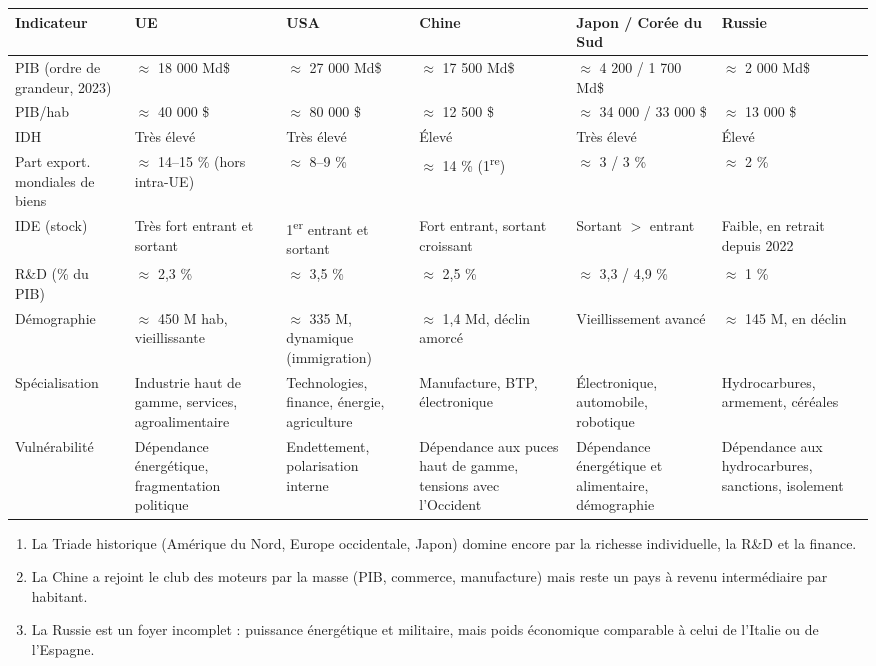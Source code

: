 \documentclass[11pt]{article}
\newcommand{\cle}[1]{{\popxbold\color{popdark}#1}}
\begin{document}
\begin{center}
\small
\begin{tabularx}{\linewidth}{|l|X|X|X|X|X|}
\hline
\rowcolor{popblueL} \textbf{Indicateur} & \textbf{UE} & \textbf{USA} & \textbf{Chine} & \textbf{Japon / Corée du Sud} & \textbf{Russie} \\
\hline
PIB (ordre de grandeur, 2023) & $\approx$ 18 000 Md\$ & $\approx$ 27 000 Md\$ & $\approx$ 17 500 Md\$ & $\approx$ 4 200 / 1 700 Md\$ & $\approx$ 2 000 Md\$ \\
\hline
PIB/hab & $\approx$ 40 000 \$ & $\approx$ 80 000 \$ & $\approx$ 12 500 \$ & $\approx$ 34 000 / 33 000 \$ & $\approx$ 13 000 \$ \\
\hline
IDH & Très élevé & Très élevé & Élevé & Très élevé & Élevé \\
\hline
Part export. mondiales de biens & $\approx$ 14--15 \% (hors intra-UE) & $\approx$ 8--9 \% & $\approx$ 14 \% (1\textsuperscript{re}) & $\approx$ 3 / 3 \% & $\approx$ 2 \% \\
\hline
IDE (stock) & Très fort entrant et sortant & 1\textsuperscript{er} entrant et sortant & Fort entrant, sortant croissant & Sortant $>$ entrant & Faible, en retrait depuis 2022 \\
\hline
R\&D (\% du PIB) & $\approx$ 2,3 \% & $\approx$ 3,5 \% & $\approx$ 2,5 \% & $\approx$ 3,3 / 4,9 \% & $\approx$ 1 \% \\
\hline
Démographie & $\approx$ 450 M hab, vieillissante & $\approx$ 335 M, dynamique (immigration) & $\approx$ 1,4 Md, déclin amorcé & Vieillissement avancé & $\approx$ 145 M, en déclin \\
\hline
Spécialisation & Industrie haut de gamme, services, agroalimentaire & Technologies, finance, énergie, agriculture & Manufacture, BTP, électronique & Électronique, automobile, robotique & Hydrocarbures, armement, céréales \\
\hline
Vulnérabilité & Dépendance énergétique, fragmentation politique & Endettement, polarisation interne & Dépendance aux puces haut de gamme, tensions avec l'Occident & Dépendance énergétique et alimentaire, démographie & Dépendance aux hydrocarbures, sanctions, isolement \\
\hline
\end{tabularx}
\end{center}

\begin{aretenir}
\begin{enumerate}
\item La \cle{Triade} historique (Amérique du Nord, Europe occidentale, Japon) domine encore par la richesse individuelle, la R\&D et la finance.
\item La \cle{Chine} a rejoint le club des moteurs par la masse (PIB, commerce, manufacture) mais reste un pays à revenu intermédiaire par habitant.
\item La \cle{Russie} est un foyer incomplet : puissance énergétique et militaire, mais poids économique comparable à celui de l'Italie ou de l'Espagne.
\end{enumerate}
\end{aretenir}
\end{document}

